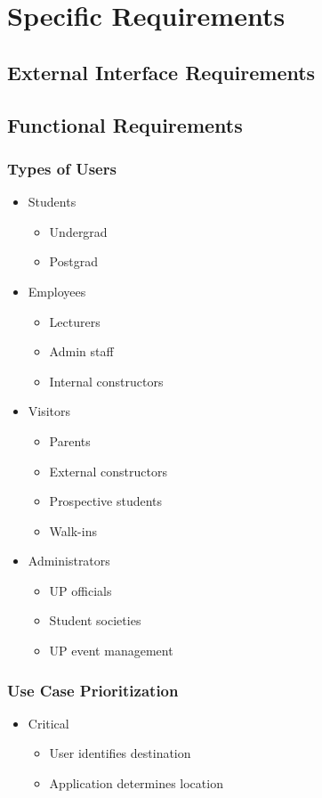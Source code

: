 \documentclass[12pt, a4paper]{article}
\begin{document}
\section{Specific Requirements}
	\subsection{External Interface Requirements}
	\subsection{Functional Requirements}
		\subsubsection{Types of Users}
			\begin{itemize}
				\item Students
				\begin{itemize}
					\item Undergrad
					\item Postgrad
				\end{itemize}
				
				\item Employees
				\begin{itemize}
					\item Lecturers
					\item Admin staff
					\item Internal constructors
				\end{itemize}
				
				\item Visitors
				\begin{itemize}
					\item Parents
					\item External constructors
					\item Prospective students
					\item Walk-ins
				\end{itemize}
				
				\item Administrators
				\begin{itemize}
					\item UP officials
					\item Student societies
					\item UP event management
				\end{itemize}
			\end{itemize}
		\subsubsection{Use Case Prioritization}
			\begin{itemize}
				\item Critical
				\begin{itemize}
					\item User identifies destination
					\item Application determines location
				\end{itemize}
			\end{itemize}
\end{document}
